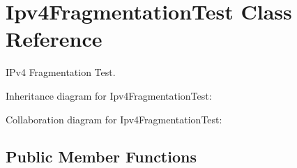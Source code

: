 \hypertarget{classIpv4FragmentationTest}{}\section{Ipv4\+Fragmentation\+Test Class Reference}
\label{classIpv4FragmentationTest}


I\+Pv4 Fragmentation Test.  




Inheritance diagram for Ipv4\+Fragmentation\+Test\+:


Collaboration diagram for Ipv4\+Fragmentation\+Test\+:
\subsection*{Public Member Functions}
